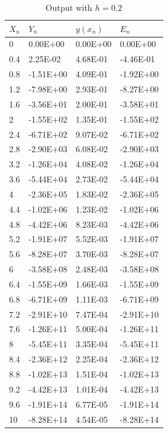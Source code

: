 \documentclass[10pt,a4paper]{report}
\begin{document}
\begin{minipage}[b]{0.45\linewidth}
\centering

\begin{table}[H]
\begin{tabular}{|l|l|l|l|}
\hline
$X_n$ & $Y_n$      & $y(x_n)$  & $E_n$      \\ \hline
0    & 0.00E+00  & 0.00E+00 & 0.00E+00  \\ \hline
0.4  & 2.25E-02  & 4.68E-01 & -4.46E-01 \\ \hline
0.8  & -1.51E+00 & 4.09E-01 & -1.92E+00 \\ \hline
1.2  & -7.98E+00 & 2.93E-01 & -8.27E+00 \\ \hline
1.6  & -3.56E+01 & 2.00E-01 & -3.58E+01 \\ \hline
2    & -1.55E+02 & 1.35E-01 & -1.55E+02 \\ \hline
2.4  & -6.71E+02 & 9.07E-02 & -6.71E+02 \\ \hline
2.8  & -2.90E+03 & 6.08E-02 & -2.90E+03 \\ \hline
3.2  & -1.26E+04 & 4.08E-02 & -1.26E+04 \\ \hline
3.6  & -5.44E+04 & 2.73E-02 & -5.44E+04 \\ \hline
4    & -2.36E+05 & 1.83E-02 & -2.36E+05 \\ \hline
4.4  & -1.02E+06 & 1.23E-02 & -1.02E+06 \\ \hline
4.8  & -4.42E+06 & 8.23E-03 & -4.42E+06 \\ \hline
5.2  & -1.91E+07 & 5.52E-03 & -1.91E+07 \\ \hline
5.6  & -8.28E+07 & 3.70E-03 & -8.28E+07 \\ \hline
6    & -3.58E+08 & 2.48E-03 & -3.58E+08 \\ \hline
6.4  & -1.55E+09 & 1.66E-03 & -1.55E+09 \\ \hline
6.8  & -6.71E+09 & 1.11E-03 & -6.71E+09 \\ \hline
7.2  & -2.91E+10 & 7.47E-04 & -2.91E+10 \\ \hline
7.6  & -1.26E+11 & 5.00E-04 & -1.26E+11 \\ \hline
8    & -5.45E+11 & 3.35E-04 & -5.45E+11 \\ \hline
8.4  & -2.36E+12 & 2.25E-04 & -2.36E+12 \\ \hline
8.8  & -1.02E+13 & 1.51E-04 & -1.02E+13 \\ \hline
9.2  & -4.42E+13 & 1.01E-04 & -4.42E+13 \\ \hline
9.6  & -1.91E+14 & 6.77E-05 & -1.91E+14 \\ \hline
10   & -8.28E+14 & 4.54E-05 & -8.28E+14 \\ \hline
\end{tabular}
\caption{Output with $h=0.2$}
\end{table}

\end{minipage}
\end{document}

